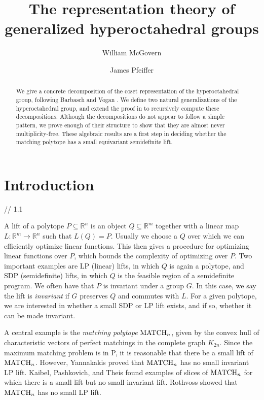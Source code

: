 \documentclass[12pt]{amsart}
\title{The representation theory of generalized hyperoctahedral groups}
\author{William McGovern}
\author{James Pfeiffer}
\numberwithin{theorem}{section}
\newcommand{\RR}{\mathbb{R}}
\newcommand{\MATCH}{\textup{MATCH}}
\begin{document}
\begin{abstract}
We give a concrete decomposition of the coset representation of the hyperoctahedral group, following Barbasch and Vogan \cite{bv}.
We define two natural generalizations of the hyperoctahedral group, and extend the proof in \cite{bv} to recursively compute these decompositions.
Although the decompositions do not appear to follow a simple pattern, we prove enough of their structure to show that they are almost never multiplicity-free.
These algebraic results are a first step in deciding whether the matching polytope has a small equivariant semidefinite lift.
\end{abstract}
\maketitle

\section{Introduction} \label{BV:Introduction}

// 1.1

A lift of a polytope $P \subseteq \RR^n$ is an object $Q \subseteq \RR^m$ together with a linear map $L: \RR^m \to \RR^n$ such that $L(Q) = P$.
Usually we choose a $Q$ over which we can efficiently optimize linear functions.
This then gives a procedure for optimizing linear functions over $P$, which bounds the complexity of optimizing over $P$.
Two important examples are LP (linear) lifts, in which $Q$ is again a polytope, and SDP (semidefinite) lifts, in which $Q$ is the feasible region of a semidefinite program.
We often have that $P$ is invariant under a group $G$.
In this case, we say the lift is {\em invariant} if $G$ preserves $Q$ and commutes with $L$.
For a given polytope, we are interested in whether a small SDP or LP lift exists, and if so, whether it can be made invariant.

A central example is the {\em matching polytope} $\MATCH_n$, given by the convex hull of characteristic vectors of perfect matchings in the complete graph $K_{2n}$.
Since the maximum matching problem is in P, it is reasonable that there be a small lift of $\MATCH_n$.
However, Yannakakis \cite{yannakakis1988expressing} proved that $\MATCH_n$ has no small invariant LP lift.
Kaibel, Pashkovich, and Theis \cite{kaibel2010symmetry} found examples of slices of $\MATCH_n$ for which there is a small lift but no small invariant lift.
Rothvoss \cite{rothvoss2013matching} showed that $\MATCH_n$ has no small LP lift.
\end{document}
